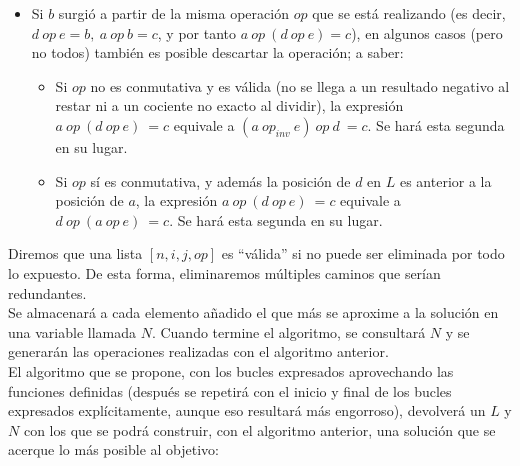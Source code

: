 \begin{itemize}
	\item Si $b$ surgió a partir de la misma operación $op$ que se está realizando
	(es decir, $d\ op\ e = b,\ a\ op\ b = c$, y por tanto $a\ op\ (d\ op\ e) = c$),
	 en algunos casos (pero no todos) también es posible descartar la operación;
	 a saber:
	\begin{itemize}
		\item Si $op$ no es conmutativa y es válida (no se llega a un resultado
		negativo al restar ni a un cociente no exacto al dividir), la expresión
		$a\ op\ (d\ op\ e)\ = c$ equivale a $(a\ op_{inv}\ e)\ op\ d\ = c$.
		Se hará esta segunda en su lugar.
		\item Si $op$ sí es conmutativa, y además la posición de $d$ en $L$ es
		anterior a la posición de $a$, la expresión $a\ op\ (d\ op\ e)\ = c$
		equivale a $d\ op\ (a\ op\ e)\ = c$. Se hará esta segunda en su lugar.
	\end{itemize}
\end{itemize}

Diremos que una lista $[n, i, j, op]$ es ``válida'' si no puede ser eliminada
por todo lo expuesto. De esta forma, eliminaremos múltiples caminos que serían redundantes.\\

Se almacenará a cada elemento añadido el que más se aproxime a la solución en
una variable llamada $N$. Cuando termine el algoritmo, se consultará $N$ y se generarán las operaciones realizadas con el algoritmo anterior. \\

El algoritmo que se propone, con los bucles expresados aprovechando las
funciones definidas (después se repetirá con el inicio y final de los bucles
expresados explícitamente, aunque eso resultará más engorroso), devolverá un
$L$ y $N$ con los que se podrá construir, con el algoritmo anterior, una
solución que se acerque lo más posible al objetivo:\\


